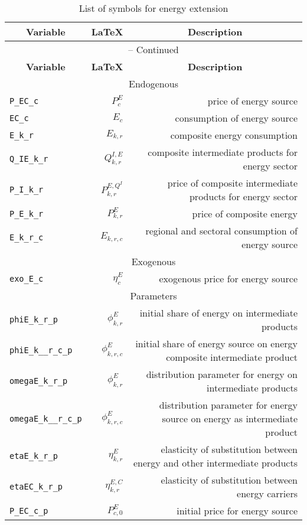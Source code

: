 
\begin{center}
\begin{longtable}{lrr}
\caption{List of symbols for energy extension}\label{tab:listofsymbolsextension2}\\%
\hline%
\multicolumn{1}{c}{\textbf{Variable}} &
\multicolumn{1}{c}{\textbf{\LaTeX}} &
\multicolumn{1}{c}{\textbf{Description}}\\%
\hline\hline%
\endfirsthead
\multicolumn{3}{c}{{\tablename} \thetable{} -- Continued}\\%
\hline%
\multicolumn{1}{c}{\textbf{Variable}} &
\multicolumn{1}{c}{\textbf{\LaTeX}} &
\multicolumn{1}{c}{\textbf{Description}}\\%
\hline\hline%
\endhead
\hline
\multicolumn{3}{c}{Endogenous}\\%
\hline
\texttt{P\_EC\_c} & $P^{E}_{c}$ & price of energy source\\
\texttt{EC\_c} & $E_{c}$ & consumption of energy source\\
\texttt{E\_k\_r} & $E_{k,r}$ & composite energy consumption \\
\texttt{Q\_IE\_k\_r} & $Q^{I,E}_{k,r}$ & composite intermediate products for energy sector \\
\texttt{P\_I\_k\_r} & $P^{E,Q^{I}}_{k,r}$ & price of composite intermediate products for energy sector \\
\texttt{P\_E\_k\_r} & $P^{E}_{k,r}$ & price of composite energy \\
\texttt{E\_k\_r\_c} & $E_{k,r,c}$ & regional and sectoral consumption of energy source \\
\hline
\multicolumn{3}{c}{Exogenous}\\%
\hline
\texttt{exo\_E\_c} & ${\eta^{E}_{c}}$ & exogenous price for energy source\\
\hline
\multicolumn{3}{c}{Parameters}\\%
\hline
\texttt{phiE\_k\_r\_p} & ${\phi^{E}_{k,r}}$ & initial share of energy on intermediate products\\
\texttt{phiE\_k\_\_r\_c\_p} & ${\phi^{E}_{k,r,c}}$ & initial share of energy source on energy composite intermediate product\\
\texttt{omegaE\_k\_r\_p} & ${\phi^{E}_{k,r}}$ & distribution parameter for energy on intermediate products\\
\texttt{omegaE\_k\_\_r\_c\_p} & ${\phi^{E}_{k,r,c}}$ & distribution parameter for energy source on energy as intermediate product\\
\texttt{etaE\_k\_r\_p} & ${\eta^{E}_{k,r}}$ & elasticity of substitution between energy and other intermediate products\\
\texttt{etaEC\_k\_r\_p} & ${\eta^{E,C}_{k,r}}$ & elasticity of substitution between energy carriers\\
\texttt{P\_EC\_c\_p} & ${P^{E}_{c,0}}$ & initial price for energy source\\
\hline%
\end{longtable}
\end{center}
